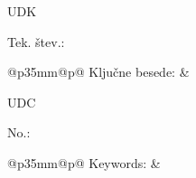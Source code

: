 
\noindent\hfill UDK \UDK\par
Tek. štev.: \tekocaStevilka\par
\vspace{16pt}

{\fontsize{14}{16.1}\selectfont\bfseries \naslovSlo\par}
\vspace{16pt}

\avtor\par
\vspace{16pt}

\noindent\begin{tabular}{@{}p{35mm}@{}p{\dimexpr\textwidth-35mm\relax}@{}}
Ključne besede: & \parbox[t]{\linewidth}{%
  \linespread{1}\fontsize{12pt}{20.7bp}\selectfont\kljucneBesede}
\end{tabular}\par
\vspace{24pt}
 \izvlecek


\begin{otherlanguage}{english}
\noindent\hfill UDC \UDK\par
No.: \tekocaStevilka\par
\vspace{16pt}

{\fontsize{14}{16.1}\selectfont\bfseries \naslovAng\par}
\vspace{16pt}

\avtor\par
\vspace{16pt}

\noindent\begin{tabular}{@{}p{35mm}@{}p{\dimexpr\textwidth-35mm\relax}@{}}
Keywords: & \parbox[t]{\linewidth}{%
  \linespread{1}\fontsize{12pt}{20.7bp}\selectfont\keywords}
\end{tabular}\par
\vspace{24pt}
\abstract
\end{otherlanguage}

